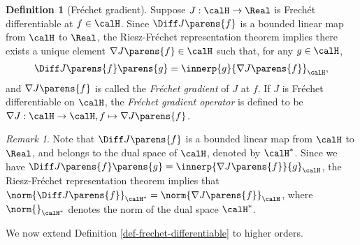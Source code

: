 \documentclass[12pt]{article}
\theoremstyle{definition}
\newtheorem{definition}{Definition}
\theoremstyle{theorem}
\theoremstyle{remark}
\newtheorem{remark}{Remark}
\begin{document}
\begin{definition}[Fr{\'e}chet gradient]\label{def-frechet-gradient}
	Suppose $J: \calH \to \Real$ is Frech{\'e}t differentiable at $f \in \calH$. Since $\Diff J \parens{f}$ is a bounded linear map from $\calH$ to $\Real$, the Riesz-Fr{\'e}chet representation theorem \parencites[Fact 2.24 in][]{Bauschke2017-he} implies there exists a unique element $\nabla J \parens{f} \in \calH$ such that, for any $g \in \calH$, 
	\begin{align}\label{eq-frechet-grad}
		\Diff J \parens{f} \parens{g} = \innerp{g}{\nabla J \parens{f}}_{\calH}, 
	\end{align}
	and $\nabla J \parens{f}$ is called the \textit{Fr{\'e}chet gradient} of $J$ at $f$. If $J$ is Fr{\'e}chet differentiable on $\calH$, the \textit{Fr{\'e}chet gradient operator} is defined to be $\nabla J: \calH \to \calH, f \mapsto \nabla J \parens{f}$. 

\end{definition}


\begin{remark}
	Note that $\Diff J \parens{f}$ is a bounded linear map from $\calH$ to $\Real$, and belongs to the dual space of $\calH$, denoted by $\calH^*$. Since we have $\Diff J \parens{f} \parens{g} = \innerp{\nabla J \parens{f}}{g}_{\calH}$, the Riesz-Fr{\'e}chet representation theorem implies that $\norm{\Diff J \parens{f}}_{\calH^*} = \norm{\nabla J \parens{f}}_{\calH}$, where $\norm{}_{\calH^*}$ denotes the norm of the dual space $\calH^*$. 
\end{remark}

We now extend Definition \ref{def-frechet-differentiable} to higher orders. 
\end{document}
